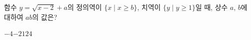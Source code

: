 \hspace*{2mm}\begin{minipage}[t]{\dimexpr\linewidth-2mm\relax}\vspace{0pt}
함수 $y=\sqrt{x-2}+a$의 정의역이 $\{x \mid x\ge b\}$, 치역이 $\{y \mid y\ge 1\}$일 때, 상수 $a$, $b$에 대하여 $ab$의 값은?
\begin{choices32}{$-4$}{$-2$}{$1$}{$2$}{$4$}\end{choices32}\end{minipage}
